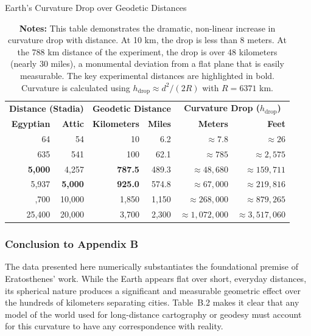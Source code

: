 \documentclass[11pt]{article}
\begin{document}
\begin{table}[htbp]
\centering
\caption{Earth's Curvature Drop over Geodetic Distances}
\label{tab:curvature_drop}
\small
\begin{tabular}{@{}rrrrrr@{}}
\toprule
\multicolumn{2}{c}{\textbf{Distance (Stadia)}} & \multicolumn{2}{c}{\textbf{Geodetic Distance}} & \multicolumn{2}{c}{\textbf{Curvature Drop ($h_{\text{drop}}$)}} \\
\cmidrule(r){1-2} \cmidrule(lr){3-4} \cmidrule(l){5-6}
\textbf{Egyptian} & \textbf{Attic} & \textbf{Kilometers} & \textbf{Miles} & \textbf{Meters} & \textbf{Feet} \\
\midrule
64 & 54 & 10 & 6.2 & $\approx 7.8$ & $\approx 26$ \\
635 & 541 & 100 & 62.1 & $\approx 785$ & $\approx 2,575$ \\
\addlinespace
\textbf{5,000} & 4,257 & \textbf{787.5} & 489.3 & $\approx 48,680$ & $\approx 159,711$ \\
5,937 & \textbf{5,000} & \textbf{925.0} & 574.8 & $\approx 67,000$ & $\approx 219,816$ \\
\addlinespace
12,700 & 10,000 & 1,850 & 1,150 & $\approx 268,000$ & $\approx 879,265$ \\
25,400 & 20,000 & 3,700 & 2,300 & $\approx 1,072,000$ & $\approx 3,517,060$ \\
\bottomrule
\end{tabular}
\captionsetup{font=small, justification=justified}
\caption*{
\textbf{Notes:} This table demonstrates the dramatic, non-linear increase in curvature drop with distance. At 10 km, the drop is less than 8 meters. At the 788 km distance of the experiment, the drop is over 48 kilometers (nearly 30 miles), a monumental deviation from a flat plane that is easily measurable. The key experimental distances are highlighted in bold. Curvature is calculated using $h_{\text{drop}} \approx d^2/(2R)$ with $R = 6371$ km.
}
\end{table}

\subsubsection*{Conclusion to Appendix B}

The data presented here numerically substantiates the foundational premise of Eratosthenes' work. While the Earth appears flat over short, everyday distances, its spherical nature produces a significant and measurable geometric effect over the hundreds of kilometers separating cities. Table~B.2 makes it clear that any model of the world used for long-distance cartography or geodesy must account for this curvature to have any correspondence with reality. 
\end{document}
